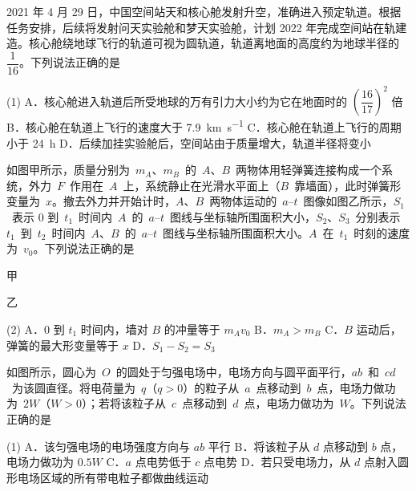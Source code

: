 \begin{question}
2021 年 4 月 29 日，中国空间站天和核心舱发射升空，准确进入预定轨道。根据任务安排，后续将发射问天实验舱和梦天实验舱，计划 2022 年完成空间站在轨建造。核心舱绕地球飞行的轨道可视为圆轨道，轨道离地面的高度约为地球半径的~$\dfrac{1}{16}$。下列说法正确的是\gkblank

\begin{gkopts}(1)
  \task A．核心舱进入轨道后所受地球的万有引力大小约为它在地面时的 $\left(\dfrac{16}{17}\right)^{2}$ 倍
  \task B．核心舱在轨道上飞行的速度大于 \SI{7.9}{\kilo\metre\per\second}
  \task C．核心舱在轨道上飞行的周期小于 \SI{24}{\hour}
  \task D．后续加挂实验舱后，空间站由于质量增大，轨道半径将变小
\end{gkopts}
\end{question}

\begin{question}
如图甲所示，质量分别为~$m_{A}$、$m_{B}$~的~$A$、$B$~两物体用轻弹簧连接构成一个系统，外力~$F$~作用在~$A$~上，系统静止在光滑水平面上（$B$~靠墙面），此时弹簧形变量为~$x$。撤去外力并开始计时，$A$、$B$~两物体运动的~$a$--$t$~图像如图乙所示，$S_{1}$~表示 0 到~$t_{1}$~时间内~$A$~的~$a$--$t$~图线与坐标轴所围面积大小，$S_{2}$、$S_{3}$~分别表示~$t_{1}$~到~$t_{2}$~时间内~$A$、$B$~的~$a$--$t$~图线与坐标轴所围面积大小。$A$~在~$t_{1}$~时刻的速度为~$v_{0}$。下列说法正确的是\gkblank


甲


乙

\begin{gkopts}(2)
  \task A．0 到 $t_{1}$ 时间内，墙对 $B$ 的冲量等于 $m_{A}v_{0}$
  \task B．$m_{A}>m_{B}$
  \task C．$B$ 运动后，弹簧的最大形变量等于 $x$
  \task D．$S_{1}-S_{2}=S_{3}$
\end{gkopts}
\end{question}

\begin{question}
如图所示，圆心为~$O$~的圆处于匀强电场中，电场方向与圆平面平行，$ab$~和~$cd$~为该圆直径。将电荷量为~$q$（$q>0$）的粒子从~$a$~点移动到~$b$~点，电场力做功为~$2W$（$W>0$）；若将该粒子从~$c$~点移动到~$d$~点，电场力做功为~$W$。下列说法正确的是\gkblank


\begin{gkopts}(1)
  \task A．该匀强电场的电场强度方向与 $ab$ 平行
  \task B．将该粒子从 $d$ 点移动到 $b$ 点，电场力做功为 $0.5W$
  \task C．$a$ 点电势低于 $c$ 点电势
  \task D．若只受电场力，从 $d$ 点射入圆形电场区域的所有带电粒子都做曲线运动
\end{gkopts}
\end{question}

